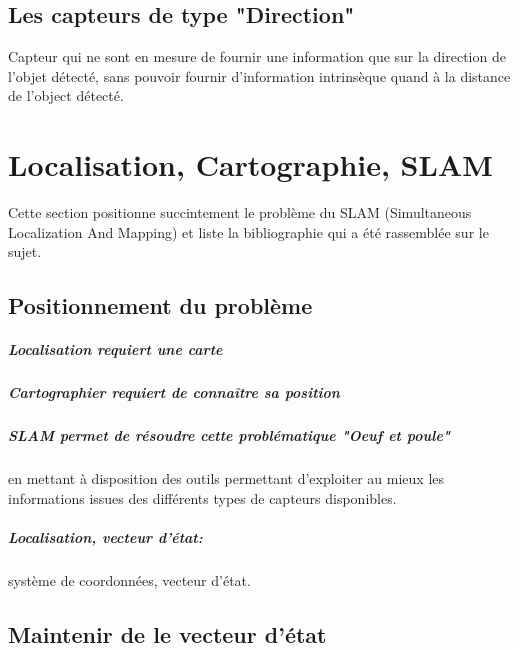 \documentclass[12pt,a4paper]{report}
\begin{document}
\section{Les capteurs de type "Direction"}
Capteur qui ne sont en mesure de fournir une information que sur la direction de l'objet détecté, sans pouvoir fournir d'information intrinsèque quand à la distance de l'object détecté.






\chapter{Localisation, Cartographie, SLAM}

Cette section positionne succintement le problème du SLAM (Simultaneous Localization And Mapping) et liste la bibliographie qui a été rassemblée sur le sujet.

\section{Positionnement du problème}

\paragraph{Localisation requiert une carte}

\paragraph{Cartographier requiert de connaître sa position}

\paragraph{SLAM permet de résoudre cette problématique "Oeuf et poule"} en mettant à disposition des outils permettant d'exploiter au mieux les informations issues des différents types de capteurs disponibles.

\paragraph{Localisation, vecteur d'état: } système de coordonnées, vecteur d'état.


\section{Maintenir de le vecteur d'état}
\end{document}
